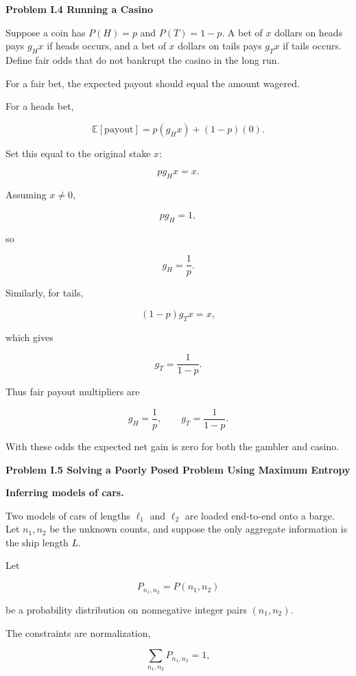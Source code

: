 \documentclass[11pt]{article}
\newcommand{\problem}[1]{%
    \vspace{1em}
    {\large\bfseries #1}
    \par
    \vspace{0.4em}
}
\newcommand{\E}{\mathbb{E}}
\begin{document}

\problem{Problem I.4 Running a Casino}

Suppose a coin has \(P(H)=p\) and \(P(T)=1-p\). A bet of \(x\) dollars on
heads pays \(g_Hx\) if heads occurs, and a bet of \(x\) dollars on tails pays
\(g_Tx\) if tails occurs. Define fair odds that do not bankrupt the casino in
the long run.

For a fair bet, the expected payout should equal the amount wagered.

For a heads bet,

\[
\E[\text{payout}]
=
p(g_Hx)+(1-p)(0).
\]

Set this equal to the original stake \(x\):

\[
p g_H x=x.
\]

Assuming \(x\neq0\),

\[
p g_H=1,
\]

so

\[
g_H=\frac1p.
\]

Similarly, for tails,

\[
(1-p)g_Tx=x,
\]

which gives

\[
g_T=\frac{1}{1-p}.
\]

Thus fair payout multipliers are

\[
g_H=\frac1p,
\qquad
g_T=\frac{1}{1-p}.
\]

With these odds the expected net gain is zero for both the gambler and
casino.


\problem{Problem I.5 Solving a Poorly Posed Problem Using Maximum Entropy}

\textbf{Inferring models of cars.}

Two models of cars of lengths \(\ell_1\) and \(\ell_2\) are loaded end-to-end
onto a barge. Let \(n_1,n_2\) be the unknown counts, and suppose the only
aggregate information is the ship length \(L\).

Let

\[
P_{n_1,n_2}=P(n_1,n_2)
\]

be a probability distribution on nonnegative integer pairs
\((n_1,n_2)\).

The constraints are normalization,

\[
\sum_{n_1,n_2}P_{n_1,n_2}=1,
\]
\end{document}
